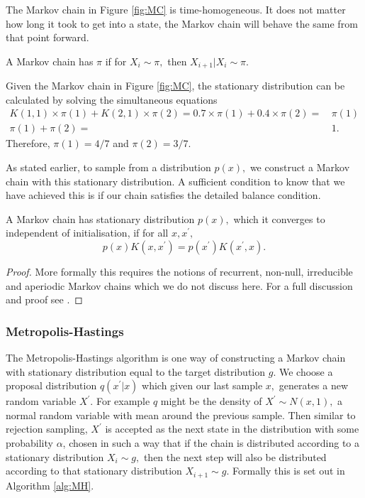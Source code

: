 The Markov chain in Figure \ref{fig:MC} is time-homogeneous. It does not
matter how long it took to get into a state, the Markov chain will behave the
same from that point forward.

\begin{definition}
    A Markov chain has  $\pi$ if for $X_i \sim \pi,$
    then $X_{i + 1} | X_i \sim \pi.$
\end{definition}

\begin{example}
    Given the Markov chain in Figure \ref{fig:MC}, the stationary distribution
    can be calculated by solving the simultaneous equations
    \begin{align*}
        K(1, 1) \times \pi(1)
        + K(2, 1) \times \pi(2) = 0.7 \times \pi(1)
        + 0.4 \times \pi(2) = & \, \pi(1) \\
        \pi(1) + \pi(2) =     & \, 1.
    \end{align*}
    Therefore, $\pi(1) = 4/7$ and $\pi(2) = 3/7.$
\end{example}

As stated earlier, to sample from a distribution $p(x),$ we construct a Markov
chain with this stationary distribution. A sufficient condition to know that
we have achieved this is if our chain satisfies the detailed balance
condition.

\begin{theorem}
    A Markov chain has stationary distribution $p(x),$ which it converges to
    independent of initialisation, if for all $x, x^\prime,$
    $$p(x)K(x, x^\prime) = p(x^\prime)K(x^\prime, x).$$
\end{theorem}

\begin{proof}
    More formally this requires the notions of recurrent, non-null,
    irreducible and aperiodic Markov chains which we do not discuss here. 
    For a full
    discussion and proof
    see \cite[Chapter 6]{robert_monte_2010}.
\end{proof}

\subsubsection*{Metropolis-Hastings}

The Metropolis-Hastings algorithm is one way of constructing a Markov
chain with stationary distribution equal to the target distribution $g.$
We choose a proposal distribution $q(x^\prime| x)$ which given our last sample
$x,$ generates a new random
variable $X^\prime.$ For example $q$ might be the density of
$X^\prime \sim N(x, 1),$ a normal random variable with mean
around the previous sample. Then similar to rejection sampling, $X^\prime$
is accepted as the next state in the distribution with some probability
$\alpha$, chosen in such a way that if the chain is distributed according to
a stationary distribution
$X_i \sim g,$ then the next step will also be distributed according to that
stationary distribution $X_{i + 1}\sim g.$ Formally this is set out in
Algorithm \ref{alg:MH}.

